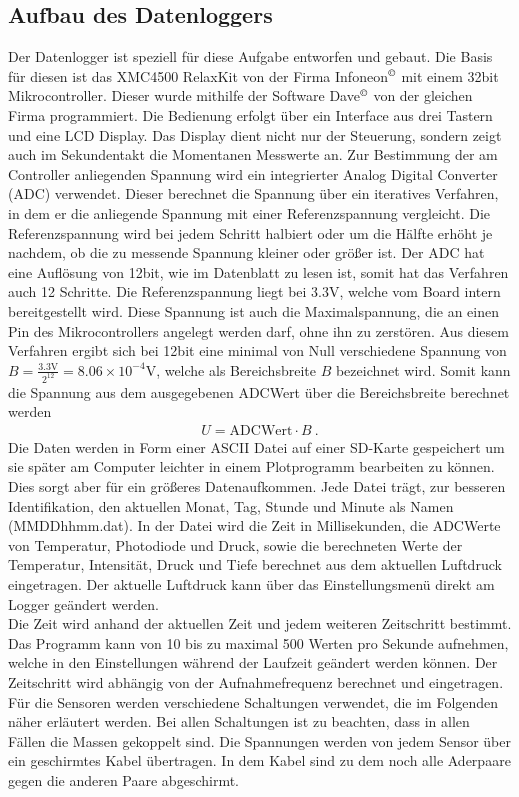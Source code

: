 \documentclass[12pt,a4paper,titlepage,headinclude,bibtotoc]{scrartcl}
\numberwithin{equation}{subsection}
\begin{document}
\subsection{Aufbau des Datenloggers}
Der Datenlogger ist speziell für diese Aufgabe entworfen und gebaut.
Die Basis für diesen ist das XMC4500 RelaxKit von der Firma Infoneon$^\copyright$ mit einem 32bit Mikrocontroller.
Dieser wurde mithilfe der Software Dave$^\copyright$ von der gleichen Firma programmiert.
Die Bedienung erfolgt über ein Interface aus drei Tastern und eine LCD Display.
Das Display dient nicht nur der Steuerung, sondern zeigt auch im Sekundentakt die Momentanen Messwerte an.
Zur Bestimmung der am Controller anliegenden Spannung wird ein integrierter Analog Digital Converter (ADC) verwendet.
Dieser berechnet die Spannung über ein iteratives Verfahren, in dem er die anliegende Spannung mit einer Referenzspannung vergleicht.
Die Referenzspannung wird bei jedem Schritt halbiert oder um die Hälfte erhöht je nachdem, ob die zu messende Spannung kleiner oder größer ist.
Der ADC hat eine Auflösung von 12bit, wie im Datenblatt \cite[7]{XMCRelaxkit} zu lesen ist, somit hat das Verfahren auch 12 Schritte.
Die Referenzspannung liegt bei 3.3\si{\volt}, welche vom Board intern bereitgestellt wird.
Diese Spannung ist auch die Maximalspannung, die an einen Pin des Mikrocontrollers angelegt werden darf, ohne ihn zu zerstören.
Aus diesem Verfahren ergibt sich bei 12bit eine minimal von Null verschiedene Spannung von $B=\frac{3.3\si{\volt}}{2^{12}}=8.06\times10^{-4}\si{\volt}$, welche als Bereichsbreite $B$ bezeichnet wird.
Somit kann die Spannung aus dem ausgegebenen ADCWert über die Bereichsbreite berechnet werden
\begin{align}
	U=\text{ADCWert}\cdot B~.\label{eq:ADCwert}
\end{align}
Die Daten werden in Form einer ASCII Datei auf einer SD-Karte gespeichert um sie später am Computer leichter in einem Plotprogramm bearbeiten zu können.
Dies sorgt aber für ein größeres Datenaufkommen.
Jede Datei trägt, zur besseren Identifikation, den aktuellen Monat, Tag, Stunde und Minute als Namen (MMDDhhmm.dat).
In der Datei wird die Zeit in Millisekunden, die ADCWerte von Temperatur, Photodiode und Druck, sowie die berechneten Werte der Temperatur, Intensität, Druck und Tiefe berechnet aus dem aktuellen Luftdruck eingetragen.
Der aktuelle Luftdruck kann über das Einstellungsmenü direkt am Logger geändert werden.\\
Die Zeit wird anhand der aktuellen Zeit und jedem weiteren Zeitschritt bestimmt.
Das Programm kann von 10 bis zu maximal 500 Werten pro Sekunde aufnehmen, welche in den Einstellungen während der Laufzeit geändert werden können.
Der Zeitschritt wird abhängig von der Aufnahmefrequenz berechnet und eingetragen.\\
Für die Sensoren werden verschiedene Schaltungen verwendet, die im Folgenden näher erläutert werden.
Bei allen Schaltungen ist zu beachten, dass in allen Fällen die Massen gekoppelt sind.
Die Spannungen werden von jedem Sensor über ein geschirmtes Kabel übertragen.
In dem Kabel sind zu dem noch alle Aderpaare gegen die anderen Paare abgeschirmt.
\end{document}
